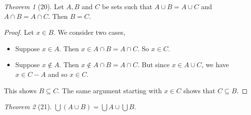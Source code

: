 \documentclass[12pt]{article}
\theoremstyle{plain}
\theoremstyle{remark}
\newtheorem*{exthm}{Theorem}
\theoremstyle{definition}
\theoremstyle{remark}
\let\oldbigcup\bigcup
\renewcommand{\bigcup}{\oldbigcup\!}
\begin{document}
\begin{exthm}[20]
 Let $A, B$ and $C$ be sets such that $A \cup B = A \cup C$ and $A \cap B = A \cap C$. Then $B = C$.
\end{exthm}
\begin{proof}
 Let $x \in B$. We consider two cases,
 \begin{itemize}
  \item Suppose $x \in A$. Then $x \in A \cap B = A \cap C$. So $x \in C$.
  \item Suppose $x \not\in A$. Then $x \not\in A \cap B = A \cap C$. But since $x \in A \cup C$, we have $x \in C - A$ and so $x \in C$.
 \end{itemize}
 This shows $B \subseteq C$. The same argument starting with $x \in C$ shows that $C \subseteq B$.
\end{proof}

\begin{exthm}[21]
 $\bigcup (A \cup B) = \bigcup A \cup \bigcup B$.
\end{exthm}
\end{document}
